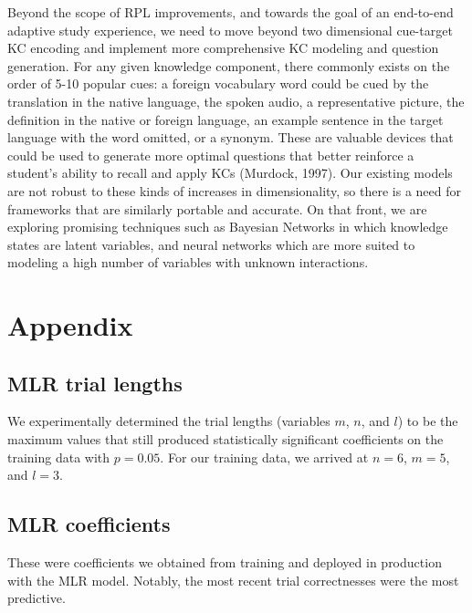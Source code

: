 \documentclass[a4paper,12pt]{article}
\begin{document}
Beyond the scope of RPL improvements, and towards the goal of an end-to-end adaptive study experience, we need to move beyond two dimensional cue-target KC encoding and implement more comprehensive KC modeling and question generation. For any given knowledge component, there commonly exists on the order of 5-10 popular cues: a foreign vocabulary word could be cued by the translation in the native language, the spoken audio, a representative picture, the definition in the native or foreign language, an example sentence in the target language with the word omitted, or a synonym. These are valuable devices that could be used to generate more optimal questions that better reinforce a student's ability to recall and apply KCs (Murdock, 1997). Our existing models are not robust to these kinds of increases in dimensionality, so there is a need for frameworks that are similarly portable and accurate. On that front, we are exploring promising techniques such as Bayesian Networks in which knowledge states are latent variables, and neural networks which are more suited to modeling a high number of variables with unknown interactions.

\section*{Appendix}

\subsection*{MLR trial lengths}
We experimentally determined the trial lengths (variables $m$, $n$, and $l$) to be the maximum values that still produced statistically significant coefficients on the training data with $p = 0.05$. For our training data, we arrived at $n = 6$, $m = 5$, and $l=3$.

\subsection*{MLR coefficients}

These were coefficients we obtained from training and deployed in production with the MLR model. Notably, the most recent trial correctnesses were the most predictive.
\end{document}
